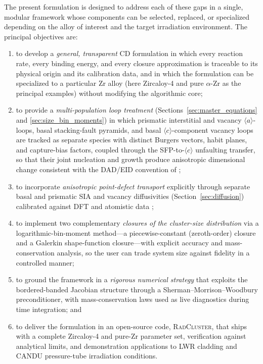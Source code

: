The present formulation is designed to address each of these gaps in a
single, modular framework whose components can be selected, replaced,
or specialized depending on the alloy of interest and the target
irradiation environment. The principal objectives are:

\begin{enumerate}
\item to develop a \emph{general, transparent} CD formulation in
      which every reaction rate, every binding energy, and every
      closure approximation is traceable to its physical origin and
 its calibration data, and in which the formulation can be
      specialized to a particular Zr alloy (here Zircaloy-4 and pure
      $\alpha$-Zr as the principal examples) without modifying the
      algorithmic core;
\item to provide a \emph{multi-population loop treatment}
      (Sections~\ref{sec:master_equations} and
      \ref{sec:size_bin_moments}) in which prismatic interstitial and
      vacancy $\langle a\rangle$-loops, basal stacking-fault pyramids,
      and basal $\langle c\rangle$-component vacancy loops are tracked
      as separate species with distinct Burgers vectors, habit planes,
      and capture-bias factors, coupled through the SFP-to-$\langle c\rangle$
      unfaulting transfer, so that their joint nucleation and growth
      produce anisotropic dimensional change consistent with the
      DAD/EID convention of \cite{Holt1988};
\item to incorporate \emph{anisotropic point-defect transport}
      explicitly through separate basal and prismatic SIA and
      vacancy diffusivities (Section~\ref{sec:diffusion}) calibrated
      against DFT and atomistic data
      \citep{Christensen2015,PatraTrinkle2019};
\item to implement two complementary \emph{closures of the
      cluster-size distribution} via a logarithmic-bin-moment
 method—a piecewise-constant (zeroth-order) closure and a
      Galerkin shape-function closure—with explicit accuracy and
      mass-conservation analysis, so the user can trade system size
      against fidelity in a controlled manner;
\item to ground the framework in a \emph{rigorous numerical
      strategy} that exploits the bordered-banded Jacobian
      structure through a Sherman--Morrison--Woodbury preconditioner,
      with mass-conservation laws used as live diagnostics during
      time integration; and
\item to deliver the formulation in an open-source code,
      \textsc{RadCluster}, that ships with a complete Zircaloy-4 and
      pure-Zr parameter set, verification against analytical limits,
      and demonstration applications to LWR cladding and CANDU
      pressure-tube irradiation conditions.
\end{enumerate}

